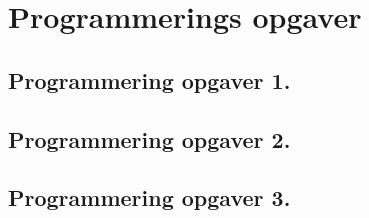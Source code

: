 
\section{Programmerings opgaver}

\subsection*{Programmering opgaver 1.}

\subsection*{Programmering opgaver 2.}

\subsection*{Programmering opgaver 3.}